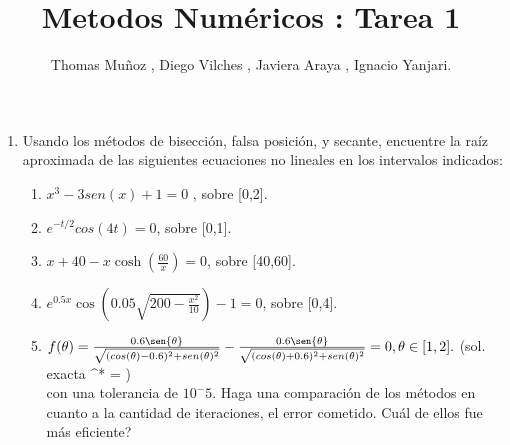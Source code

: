\documentclass{udparticle}
\title{Metodos Numéricos : Tarea 1}
\author{Thomas Muñoz , Diego Vilches , Javiera Araya , Ignacio Yanjari.}
\begin{document}
\maketitle
\begin{enumerate}

\item Usando los métodos de bisección, falsa posición, y secante, encuentre la raíz aproximada 
de las siguientes ecuaciones no lineales en los intervalos indicados:

\begin{enumerate}
    

\item  \(x^3 - 3sen(x) +1 = 0\) , sobre [0,2].

\item \( e^{-t/2} cos(4t) = 0 \), sobre [0,1].

\item \(x + 40 -x\cosh(\frac{60}{x}) = 0 \), sobre [40,60].

\item \(e^{0.5x}\cos(0.05\sqrt{200-\frac{x^2}{10}}) -1 = 0 \), sobre [0,4].

\item \(f (\theta) = \frac{0.6\sen{\theta}}{\sqrt{(cos(\theta) - 0.6)^2 + sen(\theta)^2}} -  \frac{0.6\sen{\theta}}{\sqrt{(cos(\theta) + 0.6)^2 + sen(\theta)^2}} = 0, \theta \in [1,2].\)
(sol. exacta \theta^* = ) \\
\(\)con  una   tolerancia de \(10^-5\). Haga una
comparación de los métodos en cuanto a la cantidad
de iteraciones, el error cometido. Cuál de ellos 
fue más eficiente?

\end{enumerate}




\end{enumerate}
\end{document}

